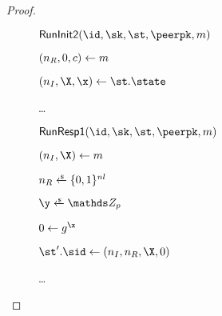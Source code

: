 \begin{proof}
\begin{collectinmacro}{\SIGMIProofTrackingCollisions}{}{}
\begin{figure}[tp]
\begin{minipage}[t]{0.49\textwidth}
	\ExptSepSpace
\begin{oracle}{$\RunInit(\id, \sk, \st, \peerpk, m)$}
	\item $(\nonce_R,\Y,\ciph) \gets m$
	\item {}
	\item $(\nonce_I,\X,\x) \gets \st.\state$
	\item \ldots
\end{oracle}
	\end{minipage}
	\begin{minipage}[t]{0.49\textwidth}
	\ExptSepSpace
	\begin{oracle}{$\RunRespI(\id,\sk,\st,\peerpk,m)$}
		\item $(\nonce_I,\X) \gets m$
		\item $\nonce_R \sample \bits^{\nl}$
		\item $\y \sample \ZZ_p$
		\item $\Y \gets g^{\x}$
		\item {} 
		\item {}
		\item {}
		\item $\st'.\sid \gets (\nonce_I, \nonce_R,\X,\Y)$
		\item \ldots
	\end{oracle}
	\ExptSepSpace


\end{minipage}
\end{figure}
\end{collectinmacro}
\end{proof}
